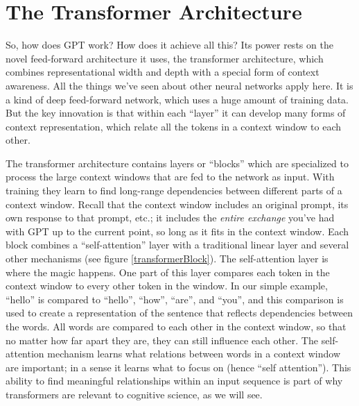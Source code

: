 \section{The Transformer Architecture}\label{transformers}

So, how does GPT work? How does it achieve all this? Its power rests on the novel feed-forward architecture it uses, the transformer architecture, which combines representational width and depth with a special form of context awareness. All the things we've seen about other neural networks apply here. It is a kind of deep feed-forward network, which uses a huge amount of training data. But the key innovation is that within each ``layer'' it can develop many forms of context representation, which relate all the tokens in a context window to each other.

The transformer architecture \cite{vaswani2017attention} contains layers or ``blocks'' which are specialized to process the large context windows that are fed to the network as input. With training they learn to find long-range dependencies between different parts of a context window. Recall that the context window  includes an original prompt, its own response to that prompt, etc.; it includes the \emph{entire exchange} you've had with GPT up to the current point, so long as it fits in the context window. Each block combines  a ``self-attention'' layer with a traditional linear layer and several other mechanisms (see figure \ref{transformerBlock}). The self-attention layer is where the magic happens. One part of this layer compares each token in the context window to every other token in the window. In our simple example, ``hello'' is compared to ``hello'', ``how'', ``are'', and ``you'', and this comparison is used to create a representation of the sentence that reflects dependencies between the words. All words are compared to each other in the context window, so that no matter how far apart they are, they can still influence each other. The self-attention mechanism learns what relations between words in a context window are important; in a sense it learns what to focus on (hence ``self attention''). This ability to find meaningful relationships within an input sequence is part of why transformers are relevant to cognitive science, as we will see.

